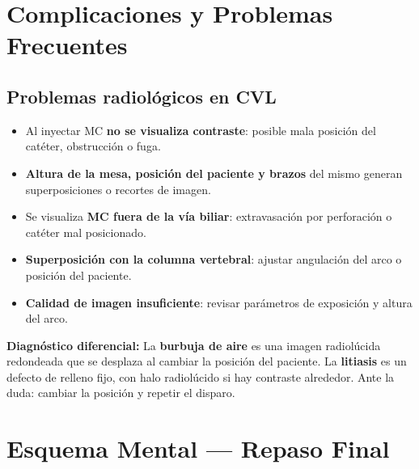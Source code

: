 \section*{Complicaciones y Problemas Frecuentes}

\subsection*{Problemas radiológicos en CVL}

\begin{itemize}[noitemsep]
	\item Al inyectar MC \textbf{no se visualiza contraste}: posible mala posición del catéter, obstrucción o fuga.
	\item \textbf{Altura de la mesa, posición del paciente y brazos} del mismo generan superposiciones o recortes de imagen.
	\item Se visualiza \textbf{MC fuera de la vía biliar}: extravasación por perforación o catéter mal posicionado.
	\item \textbf{Superposición con la columna vertebral}: ajustar angulación del arco o posición del paciente.
	\item \textbf{Calidad de imagen insuficiente}: revisar parámetros de exposición y altura del arco.
\end{itemize}

\vspace{0.5em}

\begin{cajakeypoints}
	\textbf{Diagnóstico diferencial:} La \textbf{burbuja de aire} es una imagen radiolúcida redondeada que se desplaza al cambiar la posición del paciente. La \textbf{litiasis} es un defecto de relleno fijo, con halo radiolúcido si hay contraste alrededor. Ante la duda: cambiar la posición y repetir el disparo.
\end{cajakeypoints}

\section*{Esquema Mental --- Repaso Final}

